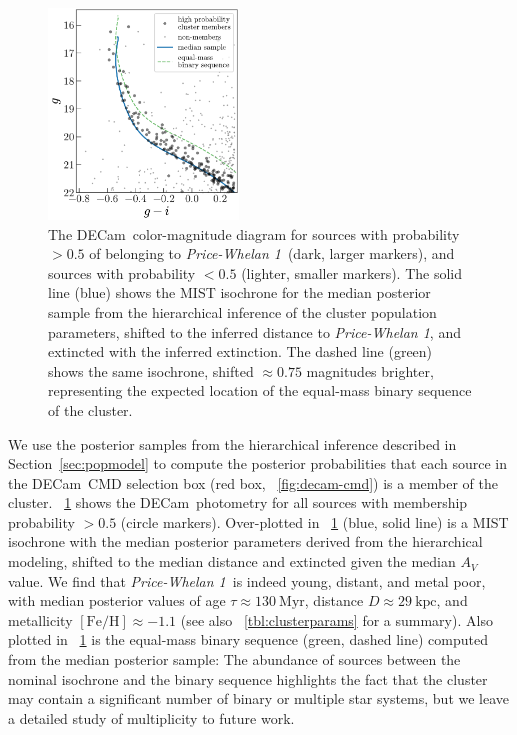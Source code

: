 \documentclass[twocolumn]{aastex62}
\newcommand{\acronym}[1]{{\small{#1}}}
\newcommand{\decam}{DECam}
\newcommand{\sectionname}{Section}
\newcommand{\feh}{\ensuremath{[\textrm{Fe} / \textrm{H}]}}
\newcommand{\clustername}{\textsl{Price-Whelan 1}}
\newcommand{\clage}{\ensuremath{130~\textrm{Myr}}}
\newcommand{\clfeh}{\ensuremath{-1.1}}
\newcommand{\cldist}{\ensuremath{29~\textrm{kpc}}}
\begin{document}
\begin{figure}[htb]
\centering
\includegraphics[width=0.45\textwidth]{figures/hierarch-results.pdf}
\caption{The \decam\ color-magnitude diagram for sources with probability $>0.5$ of belonging to \clustername\ (dark, larger markers), and sources with probability $<0.5$ (lighter, smaller markers).
The solid line (blue) shows the \acronym{MIST} isochrone for the median posterior sample from the hierarchical inference of the cluster population parameters, shifted to the inferred distance to \clustername, and extincted with the inferred extinction.
The dashed line (green) shows the same isochrone, shifted $\approx 0.75$ magnitudes brighter, representing the expected location of the equal-mass binary sequence of the cluster.
}
\label{fig:hierarch-iso}
\end{figure}

We use the posterior samples from the hierarchical inference described in \sectionname~\ref{sec:popmodel} to compute the posterior probabilities that each source in the \decam\ CMD selection box (red box, \figurename~\ref{fig:decam-cmd}) is a member of the cluster.
\figurename~\ref{fig:hierarch-iso} shows the \decam\ photometry for all sources with membership probability $> 0.5$ (circle markers).
Over-plotted in \figurename~\ref{fig:hierarch-iso} (blue, solid line) is a \acronym{MIST} isochrone with the median posterior parameters derived from the hierarchical modeling, shifted to the median distance and extincted given the median $A_V$ value.
We find that \clustername\ is indeed young, distant, and metal poor, with median posterior values of age $\tau \approx \clage$, distance $D \approx \cldist$, and metallicity $\feh \approx \clfeh$ (see also \tablename~\ref{tbl:clusterparams} for a summary).
Also plotted in \figurename~\ref{fig:hierarch-iso} is the equal-mass binary sequence (green, dashed line) computed from the median posterior sample: The abundance of sources between the nominal isochrone and the binary sequence highlights the fact that the cluster may contain a significant number of binary or multiple star systems, but we leave a detailed study of multiplicity to future work.
\end{document}
